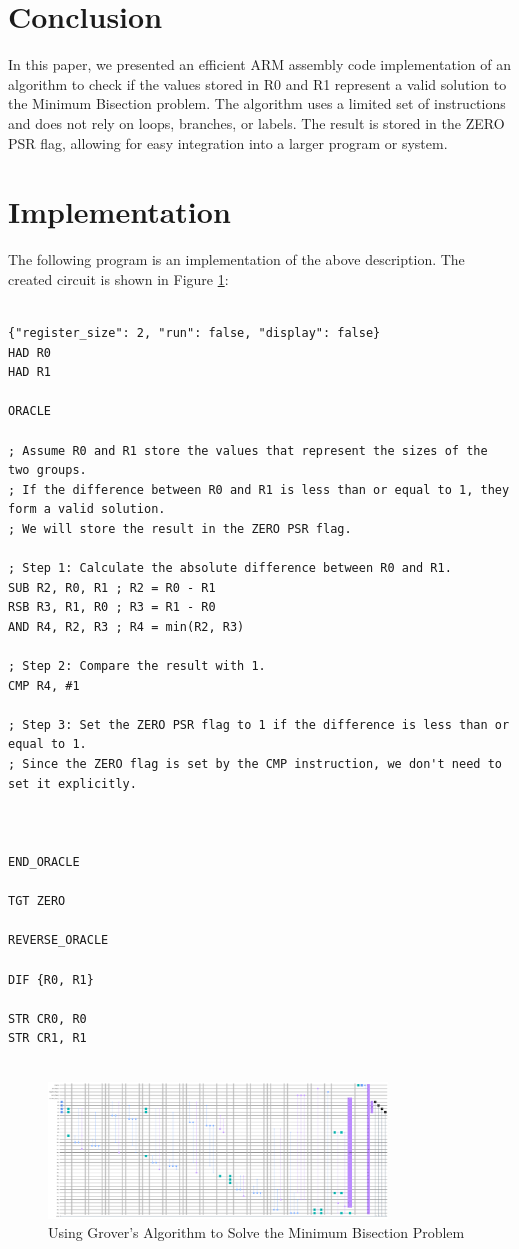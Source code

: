 \section{Conclusion}

In this paper, we presented an efficient ARM assembly code implementation of an algorithm to check if the values stored in R0 and R1 represent a valid solution to the Minimum Bisection problem. The algorithm uses a limited set of instructions and does not rely on loops, branches, or labels. The result is stored in the ZERO PSR flag, allowing for easy integration into a larger program or system.



\section{Implementation}

The following program is an implementation of the above description. The created circuit is shown in Figure \ref{fig:Minimum_Bisection}:

\begin{lstlisting}

{"register_size": 2, "run": false, "display": false}
HAD R0
HAD R1

ORACLE

; Assume R0 and R1 store the values that represent the sizes of the two groups.
; If the difference between R0 and R1 is less than or equal to 1, they form a valid solution.
; We will store the result in the ZERO PSR flag.

; Step 1: Calculate the absolute difference between R0 and R1.
SUB R2, R0, R1 ; R2 = R0 - R1
RSB R3, R1, R0 ; R3 = R1 - R0
AND R4, R2, R3 ; R4 = min(R2, R3)

; Step 2: Compare the result with 1.
CMP R4, #1

; Step 3: Set the ZERO PSR flag to 1 if the difference is less than or equal to 1.
; Since the ZERO flag is set by the CMP instruction, we don't need to set it explicitly.



END_ORACLE

TGT ZERO

REVERSE_ORACLE

DIF {R0, R1}

STR CR0, R0
STR CR1, R1


\end{lstlisting}

\begin{figure}[htp]
    \centering
    \includegraphics[width=9cm]{Figures/Minimum_Bisection_circuit.png}
    \caption{Using Grover's Algorithm to Solve the Minimum Bisection Problem}
    \label{fig:Minimum_Bisection}
\end{figure}

